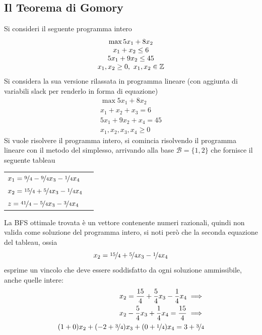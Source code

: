 \documentclass[10pt, letterpaper]{report}
\begin{document}
\subsection{Il Teorema di Gomory}
Si consideri il seguente programma intero \begin{equation}
    \begin{matrix}
        \max 5x_1+8x_2\\ x_1+x_2\le 6\\ 
        5x_1+9x_2\le45\\ 
        x_1,x_2\ge 0, \ x_1,x_2\in {\mathbb Z}
    \end{matrix}
\end{equation}
Si considera la sua versione rilassata in programma lineare (con aggiunta di variabili slack per renderlo in forma di equazione)
\begin{equation}
    \begin{matrix}
        \max 5x_1+8x_2\\ x_1+x_2+x_3= 6\\ 
        5x_1+9x_2+x_4=45\\ 
        x_1,x_2,x_3,x_4\ge 0
    \end{matrix}
\end{equation}
Si vuole risolvere il programma intero, si comincia risolvendo il programma lineare con il  metodo del simplesso, arrivando alla base $\mathcal B=\{1,2\}$ che fornisce il seguente tableau
\begin{center}
    \begin{tabular}{|l|l|}\hline 
        $x_1=\nicefrac{9}{4}-\nicefrac{9}{4}x_3-\nicefrac{1}{4}x_4$\\ 
        $x_2=\nicefrac{15}{4}+\nicefrac{5}{4}x_3-\nicefrac{1}{4}x_4$\\ 
        \hline 
        $z=\nicefrac{41}{4}-\nicefrac{5}{4}x_3-\nicefrac{3}{4}x_4$ \\\hline 
    \end{tabular}
\end{center}
La BFS ottimale trovata è un vettore contenente numeri razionali, quindi non valida come soluzione del programma intero, si noti però che la seconda equazione del tableau, ossia 
$$x_2=\nicefrac{15}{4}+\nicefrac{5}{4}x_3-\nicefrac{1}{4}x_4$$
esprime un vincolo che deve essere soddisfatto da ogni soluzione ammissibile, anche quelle intere:
\begin{eqnarray*}
    x_2=\frac{15}{4}+\frac{5}{4}x_3-\frac{1}{4}x_4\implies \\
    x_2-\frac{5}{4}x_3+\frac{1}{4}x_4=\frac{15}{4}\implies \\
    (1+0)x_2+(-2+\nicefrac{3}{4})x_3+(0+\nicefrac{1}{4})x_4=3+\nicefrac{3}{4}
\end{eqnarray*}
\end{document}

